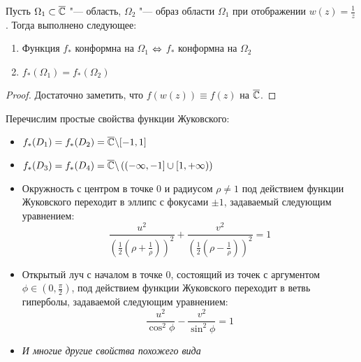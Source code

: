 \begin{proposition}
	Пусть $\Omega_1 \subset \overline{\mathbb{C}}$ "--- область, $\Omega_2$ "--- образ области $\Omega_1$ при отображении $w(z) = \frac 1z$. Тогда выполнено следующее:
	\begin{enumerate}
		\item Функция $f_*$ конформна на $\Omega_1$ $\Leftrightarrow$ $f_*$ конформна на $\Omega_2$
		\item $f_*(\Omega_1) = f_*(\Omega_2)$
	\end{enumerate}
\end{proposition}

\begin{proof}
	Достаточно заметить, что $f(w(z)) \equiv f(z)$ на $\overline{\mathbb{C}}$.
\end{proof}

\begin{note}
	Перечислим простые свойства функции Жуковского:
	\begin{itemize}
		\item $f_*(D_1) = f_*(D_2) = \overline{\mathbb{C}} \backslash [-1, 1]$
		\item $f_*(D_3) = f_*(D_4) = \overline{\mathbb{C}} \backslash \left((-\infty, -1] \cup [1, +\infty)\right)$
		\item Окружность с центром в точке $0$ и радиусом $\rho \ne 1$ под действием функции Жуковского переходит в эллипс с фокусами $\pm 1$, задаваемый следующим уравнением:
		\[\frac{u^2}{\left(\frac12\left(\rho + \frac 1\rho\right)\right)^2} + \frac{v^2}{\left(\frac12\left(\rho - \frac 1\rho\right)\right)^2} = 1\]
		\item Открытый луч с началом в точке $0$, состоящий из точек с аргументом $\phi \in \left(0, \frac\pi 2\right)$, под действием функции Жуковского переходит в ветвь гиперболы, задаваемой следующим уравнением:
		\[\frac{u^2}{\cos^2\phi} - \frac{v^2}{\sin^2\phi} = 1\]
		\item \textit{И многие другие свойства похожего вида}
	\end{itemize}
\end{note}